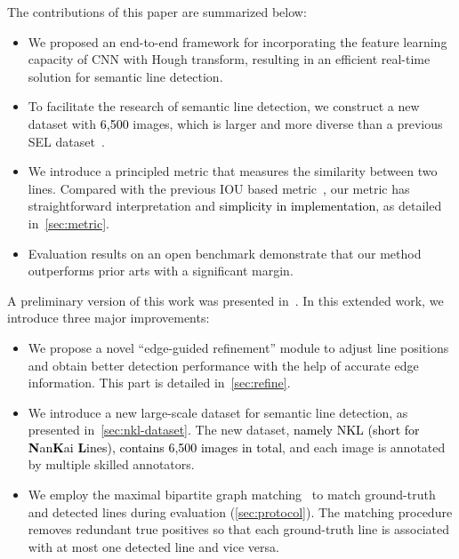\documentclass[10pt,journal,cspaper,compsoc]{IEEEtran}
\newcommand{\revise}[1]{{\textcolor{black}{#1}}}
\begin{document}
The contributions of this paper are summarized below:
\begin{itemize}\setlength\itemsep{0.3em}
  \item We proposed an end-to-end framework for incorporating the feature learning capacity of CNN with Hough transform, resulting in an efficient real-time solution for semantic line detection.
  
  \item To facilitate the research of semantic line detection, we construct
    a new dataset with \revise{6,500} images, which is larger and more diverse than a previous SEL dataset~\cite{lee2017semantic}.
  
  \item We introduce a principled metric that measures the similarity between two lines. 
    Compared with the previous IOU based metric~\cite{lee2017semantic},
    our metric has straightforward interpretation and \revise{simplicity in implementation},
    as detailed in~\cref{sec:metric}.
  
    \item Evaluation results on an open benchmark demonstrate that our method 
    outperforms prior arts with a significant margin.
\end{itemize}

A preliminary version of this work was presented in~\cite{eccv2020line}.
In this extended work, we introduce three major improvements:
\begin{itemize}\setlength\itemsep{0.3em}
  \item We propose a novel ``edge-guided refinement'' module to adjust line positions and obtain better detection performance with the help of accurate edge information.
This part is detailed in~\cref{sec:refine}.
\item We introduce a new large-scale dataset for semantic line detection, as presented in~\cref{sec:nkl-dataset}.
The new dataset, \revise{namely NKL
  (short for \textbf{N}an\textbf{K}ai \textbf{L}ines),
  contains 6,500 images in total}, and each image is annotated by multiple skilled annotators.
\item We employ the maximal bipartite graph matching~\cite{kuhn1955hungarian} to match ground-truth and detected lines during evaluation (\cref{sec:protocol}).
The matching procedure removes redundant true positives so that each ground-truth line is associated with
  at most one detected line and vice versa.
\end{itemize}
\end{document}
